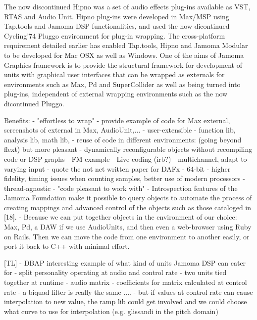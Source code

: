 \documentclass[twoside,10pt]{article}
\begin{document}
The now discontinued Hipno\cite{Place:2005} was a set of audio effects plug-ins available as VST, RTAS and Audio Unit. Hipno plug-ins were developed in Max/MSP using Tap.tools and Jamoma DSP functionalities, and used the now dicontinued Cycling'74 Pluggo environment for plug-in wrapping. The cross-platform requirement detailed earlier has enabled Tap.tools, Hipno and Jamoma Modular to be developed for Mac OSX as well as Windows. One of the aims of Jamoma Graphics framework is to provide the structural framework for development of units with graphical user interfaces that can be wrapped as externals for environments such as Max, Pd and SuperCollider as well as being turned into plug-ins, independent of external wrapping environments such as the now dicontinued Pluggo.


    Benefits:
        - "effortless to wrap" -  provide example of code for Max external, screenshots of external in Max, AudioUnit,...
        - user-extensible - function lib, analysis lib, math lib, 
        - reuse of code in different environments: (going beyond flext) but more pleasant
        - dynamically reconfigurable objects without recompiling code or DSP graphs
            - FM example
            - Live coding (irb?)
        - multichannel, adapt to varying input  - quote the not net written paper for DAFx
        - 64-bit - higher fidelity, timing issues when counting samples, better use of modern processors
        - thread-agnostic
        - "code pleasant to work with"
        - Introspection features of the Jamoma Foundation make it possible to query objects to automate the process of creating mappings and advanced control of the objects such as those cataloged in [18].
        - Because we can put together objects in the environment of our choice: Max, Pd, a DAW if we use AudioUnits, and then even a web-browser using Ruby on Rails. Then we can move the code from one environment to another easily, or port it back to C++ with minimal effort.




[TL]    - DBAP interesting example of what kind of units Jamoma DSP can cater for
        - split personality operating at audio and control rate
            - two units tied together at runtime
                - audio matrix
                - coefficients for matrix calculated at control rate
        - a biquad filter is really the same ....
            - but if values at control rate can cause interpolation to new value, the ramp lib could get involved and we could choose what curve to use for interpolation (e.g. glissandi in the pitch domain)
\end{document}
